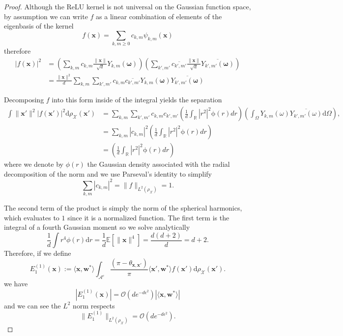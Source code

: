 \begin{proof}
    Although the ReLU kernel is not universal on the Gaussian function space, by assumption we can write $f$ as a linear combination of elements of the eigenbasis of the kernel
    \[
        f(\bm x) = \sum_{k,m \geq 0} c_{k, m}\psi_{k, m}(\bm x)
    \]
    therefore
    \begin{align*}
        |f(\bm{x})|^2 &= \left( \sum_{k,m} c_{k,m} \frac{\|\bm{x}\|}{\sqrt{d}} Y_{k,m}(\bm \omega) \right) \left( \sum_{k',m'} \overline{c_{k',m'}} \frac{\|\bm{x}\|}{\sqrt{d}} \overline{Y_{k',m'}(\bm \omega)} \right) \\
        &= \frac{\|\bm{x}\|^2}{d} \sum_{k,m} \sum_{k',m'} c_{k,m} \overline{c_{k',m'}} Y_{k,m}(\bm \omega) \overline{Y_{k',m'}(\bm \omega)}
    \end{align*}

    Decomposing $f$ into this form inside of the integral yields the separation
    \begin{align*}
        \int \|\bm x'\|^2 |f(\bm x')|^2\mathrm d \rho_{\mathcal X}(\bm x') &= \sum_{k,m} \sum_{k', m'} c_{k,m} c_{k',m'} \left(\frac{1}{d}\int_{\mathbb R}| r^2|^2 \mathrm \phi(r)dr\right) \left(\int_{\Omega}Y_{k,m}( \omega)\overline{Y_{k',m'}(\omega)}\mathrm d\Omega\right),\\
        &= \sum_{k,m}|c_{k,m}|^2\left(\frac{1}{d}\int_{\mathbb R}| r^2|^2 \mathrm \phi(r)dr\right)\\
        &=\left(\frac{1}{d}\int_{\mathbb R}| r^2|^2 \mathrm \phi(r)dr\right)
    \end{align*}
    where we denote by $\phi(r)$ the Gaussian density associated with the radial decomposition of the norm and we use Parseval's identity to simplify
    \[
        \sum_{k,m}|c_{k,m}|^2 = \|f\|_{L^2(\rho_{\mathcal X})} = 1.
    \]
    
    The second term of the product is simply the norm of the spherical harmonics, which evaluates to $1$ since it is a normalized function. The first term is the integral of a fourth Gaussian moment so we solve analytically 
    \[
        \frac{1}{d}\int r^4\phi(r)\mathrm dr = \frac{1}{d}\mathbb E[\|\bm x\|^4] = \frac{d(d+2)}{d} = d+2.
    \]
    Therefore, if we define
    \[
        E_1^{(1)}(\bm x) := \langle \bm x, \bm w^*\rangle \int_{\mathcal A^c} \frac{(\pi - \theta_{\bm x, \bm x'})}{\pi}\langle \bm x', \bm w^*\rangle f(\bm x')\mathrm d\rho_{\mathcal X}(\bm x').
    \]
    we have
    \[
        \left|E_1^{(1)}(\bm x)\right| = \mathcal O(de^{-d\epsilon^2})|\langle\bm x, \bm w^*\rangle|
    \]
    and we can see the $L^2$ norm respects
    \[
        \|E_1^{(1)}\|_{L^2(\rho_{\mathcal X})} = \mathcal O(de^{-d\epsilon^2}).
    \]
    

\end{proof}
